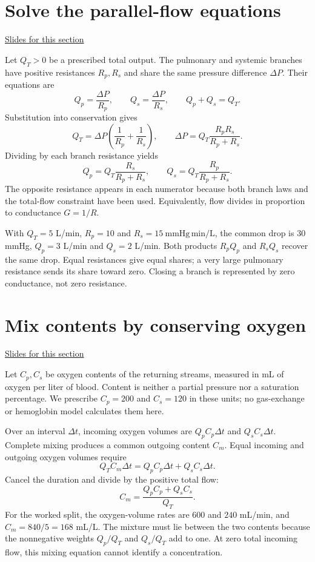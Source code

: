 \documentclass[11pt,letterpaper]{article}
\theoremstyle{definition}\newtheorem{definition}{Definition}\newtheorem{example}{Example}
\numberwithin{equation}{section}
\begin{document}
\section{Solve the parallel-flow equations}
\hypertarget{note-solve-the-parallel-flow-equations}{}\label{note:solve-the-parallel-flow-equations}
{\small \href{slides.html\#frame=three-equations-for-a-parallel-split\&step=1}{Slides for this section}}\par
Let $Q_T>0$ be a prescribed total output. The pulmonary and systemic branches have positive resistances $R_p,R_s$ and share the same pressure difference $\Delta P$. Their equations are
\[
Q_p=\frac{\Delta P}{R_p},\qquad Q_s=\frac{\Delta P}{R_s},\qquad Q_p+Q_s=Q_T.
\]
Substitution into conservation gives
\[
Q_T=\Delta P\left(\frac1{R_p}+\frac1{R_s}\right),\qquad
\Delta P=Q_T\frac{R_pR_s}{R_p+R_s}.
\]
Dividing by each branch resistance yields
\begin{equation}
Q_p=Q_T\frac{R_s}{R_p+R_s},\qquad
Q_s=Q_T\frac{R_p}{R_p+R_s}.
\end{equation}
The opposite resistance appears in each numerator because both branch laws and the total-flow constraint have been used. Equivalently, flow divides in proportion to conductance $G=1/R$.

With $Q_T=5$ L/min, $R_p=10$ and $R_s=15\ \mathrm{mmHg\,min/L}$, the common drop is $30$ mmHg, $Q_p=3$ L/min and $Q_s=2$ L/min. Both products $R_pQ_p$ and $R_sQ_s$ recover the same drop. Equal resistances give equal shares; a very large pulmonary resistance sends its share toward zero. Closing a branch is represented by zero conductance, not zero resistance.

\section{Mix contents by conserving oxygen}
\hypertarget{note-mix-contents-by-conserving-oxygen}{}\label{note:mix-contents-by-conserving-oxygen}
{\small \href{slides.html\#frame=oxygen-content-has-a-transport-unit\&step=1}{Slides for this section}}\par
Let $C_p,C_s$ be oxygen contents of the returning streams, measured in mL of oxygen per liter of blood. Content is neither a partial pressure nor a saturation percentage. We prescribe $C_p=200$ and $C_s=120$ in these units; no gas-exchange or hemoglobin model calculates them here.

Over an interval $\Delta t$, incoming oxygen volumes are $Q_pC_p\Delta t$ and $Q_sC_s\Delta t$. Complete mixing produces a common outgoing content $C_m$. Equal incoming and outgoing oxygen volumes require
\[
Q_TC_m\Delta t=Q_pC_p\Delta t+Q_sC_s\Delta t.
\]
Cancel the duration and divide by the positive total flow:
\begin{equation}
C_m=\frac{Q_pC_p+Q_sC_s}{Q_T}.
\end{equation}
For the worked split, the oxygen-volume rates are $600$ and $240$ mL/min, and $C_m=840/5=168$ mL/L. The mixture must lie between the two contents because the nonnegative weights $Q_p/Q_T$ and $Q_s/Q_T$ add to one. At zero total incoming flow, this mixing equation cannot identify a concentration.
\end{document}
